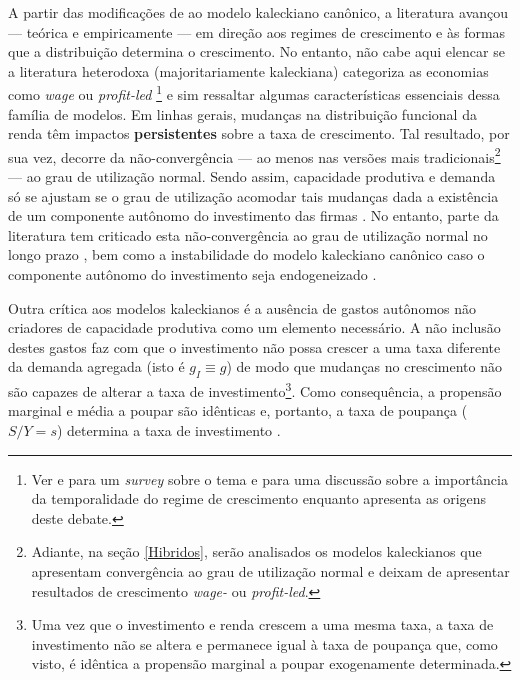 A partir das modificações de \textcite{bhaduri_unemployment_1990} ao modelo kaleckiano canônico, a literatura avançou --- teórica e empiricamente --- em direção aos regimes de crescimento e às formas que a distribuição determina o crescimento.
No entanto, não  cabe aqui elencar se a  literatura heterodoxa (majoritariamente kaleckiana)  categoriza as economias como \textit{wage} ou \textit{profit-led}
\footnote{Ver 
	\textcite{setterfield_distribution_2002} 
	e \textcite{onaran_is_2013} para um  \textit{survey} sobre o tema e \textcite{blecker_wage_led_2016} para uma discussão sobre a importância da temporalidade do regime de crescimento enquanto \textcite{lavoie_origins_2017} apresenta as origens deste debate.} 
e sim ressaltar algumas  características essenciais dessa família de modelos. Em linhas gerais, mudanças na distribuição funcional da renda têm impactos \textbf{persistentes} sobre a taxa de crescimento. 
Tal resultado, por sua vez, decorre da não-convergência --- ao menos nas versões mais tradicionais\footnote{
	Adiante, na seção \ref{Hibridos}, serão analisados os modelos kaleckianos que apresentam convergência ao grau de utilização normal e deixam de apresentar resultados de crescimento \textit{wage-} ou \textit{profit-led}. 
} --- ao grau de utilização normal. Sendo assim, capacidade produtiva e demanda só se ajustam se o grau de utilização acomodar tais mudanças dada a existência de um componente autônomo do investimento das firmas \cite[p.~84--86]{serrano_sraffian_2017}.
No entanto, parte da literatura tem criticado esta não-convergência ao grau de utilização normal no longo prazo \cites{skott_finance_1988}{skott_theoretical_2012},
bem como a instabilidade do modelo kaleckiano canônico caso o componente autônomo do investimento seja endogeneizado \cites{hein_harrodian_2012}{allain_tackling_2015}{nah_long-run_2017}.

Outra crítica aos modelos kaleckianos é a ausência de gastos autônomos não criadores de capacidade produtiva como um elemento necessário.
A não inclusão destes gastos faz com que o investimento não possa crescer a uma taxa diferente da demanda agregada (isto é $g_I \equiv g$) de modo que mudanças no crescimento não são capazes de alterar a taxa de investimento\footnote{Uma vez que o investimento e renda crescem a uma mesma taxa, a taxa de investimento não se altera e permanece igual à taxa de poupança que, como visto, é idêntica a propensão marginal a poupar exogenamente determinada.}. 
Como consequência, a propensão marginal e média a poupar são idênticas e, portanto, a taxa de poupança ($S/Y = s$) determina a taxa de investimento \cite[p.~5--7]{fagundes_role_2017}.

